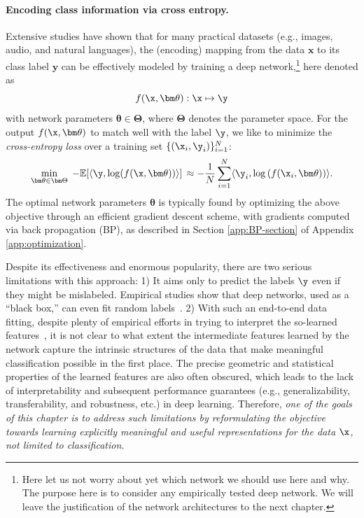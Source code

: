 \documentclass[../../book-main.tex]{subfiles}
\begin{document}
\paragraph{Encoding class information via cross entropy.}  Extensive studies have shown that for many practical datasets (e.g., images, audio, and natural languages), the (encoding) mapping from the data $\bm{x}$ to its class label $\bm{y}$ can be effectively modeled by training a deep network,\footnote{Here let us not worry about yet which network we should use here and why. The purpose here is to consider any empirically tested deep network. We will leave the justification of the network architectures to the next chapter.} here denoted as $$f(\x, \bm \theta):\x \mapsto \y$$ with network parameters $\bm \theta \in \bm \Theta$, where $\bm \Theta$ denotes the parameter space. For the output $f(\x, \bm \theta)$ to match well with the label $\y$, we like to  minimize the {\em cross-entropy loss} over a training set $\{(\x_i, \y_i)\}_{i=1}^N$: 
\begin{equation}
   \min_{\bm \theta \in \bm \Theta} \; - \mathbb{E}[\langle \y, \log(f(\x, \bm \theta)) \rangle] \, \approx - \frac{1}{N}\sum_{i=1}^N \langle \y_i, \log\left(f(\x_i, \bm \theta)\right) \rangle.
   \label{chap4-eqn:cross-entropy}
\end{equation}
The optimal network parameters $\bm \theta $ is typically found by optimizing the above objective through an efficient gradient descent scheme, with gradients computed via back propagation (BP), as described in Section \ref{app:BP-section} of Appendix \ref{app:optimization}.

Despite its effectiveness and enormous popularity, there are two serious limitations with this approach:  1) It aims only to predict the labels $\y$ even if they might be mislabeled. Empirical studies show that deep networks, used as a ``black box,'' can even fit random labels~\cite{zhang2017understanding}.
2) With such an end-to-end data fitting,
despite plenty of empirical efforts in trying to interpret the so-learned features~\cite{Zeiler-ECCV2014},
it is not clear to what extent the intermediate features learned by the network capture the intrinsic structures of the data that make meaningful classification possible in the first place. The precise geometric and statistical properties of the learned features are also often obscured, which leads to the lack of interpretability and subsequent performance guarantees (e.g., generalizability, transferability, and robustness, etc.) in deep learning.
Therefore, {\em one of the goals of this chapter is to address such limitations by reformulating the objective towards learning explicitly meaningful and useful representations for the data $\x$, not limited to classification.}
\end{document}

